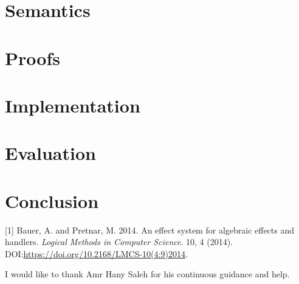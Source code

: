\documentclass[sigplan,10pt]{acmart}\settopmatter{printfolios=true}
\begin{document}
\section{Semantics}\label{semantics}

\section{Proofs}\label{proofs}

\section{Implementation}\label{implementation}

\section{Evaluation}\label{evaluation}

\section*{Conclusion}\label{conclusion}

\hypertarget{refs}{}
\hypertarget{ref-effectsystem}{}
{[}1{]} Bauer, A. and Pretnar, M. 2014. An effect system for algebraic
effects and handlers. \emph{Logical Methods in Computer Science}. 10, 4
(2014). DOI:\url{https://doi.org/10.2168/LMCS-10(4:9)2014}.

\begin{acks}
  I would like to thank Amr Hany Saleh for his continuous guidance and help.
\end{acks}



\end{document}
